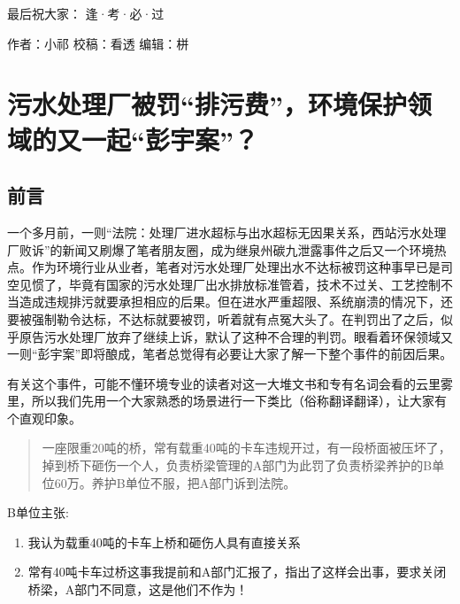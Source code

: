 \documentclass[]{book}
\begin{document}
最后祝大家： 逢·考·必·过

作者：小祁
校稿：看透
编辑：栟

\hypertarget{ux6c61ux6c34ux5904ux7406ux5382ux88abux7f5aux6392ux6c61ux8d39ux73afux5883ux4fddux62a4ux9886ux57dfux7684ux53c8ux4e00ux8d77ux5f6dux5b87ux6848}{%
\section{污水处理厂被罚``排污费''，环境保护领域的又一起``彭宇案''？}\label{ux6c61ux6c34ux5904ux7406ux5382ux88abux7f5aux6392ux6c61ux8d39ux73afux5883ux4fddux62a4ux9886ux57dfux7684ux53c8ux4e00ux8d77ux5f6dux5b87ux6848}}

\hypertarget{ux524dux8a00-1}{%
\subsection{前言}\label{ux524dux8a00-1}}

一个多月前，一则``法院：处理厂进水超标与出水超标无因果关系，西站污水处理厂败诉''的新闻又刷爆了笔者朋友圈，成为继泉州碳九泄露事件之后又一个环境热点。作为环境行业从业者，笔者对污水处理厂处理出水不达标被罚这种事早已是司空见惯了，毕竟有国家的污水处理厂出水排放标准管着，技术不过关、工艺控制不当造成违规排污就要承担相应的后果。但在进水严重超限、系统崩溃的情况下，还要被强制勒令达标，不达标就要被罚，听着就有点冤大头了。在判罚出了之后，似乎原告污水处理厂放弃了继续上诉，默认了这种不合理的判罚。眼看着环保领域又一则``彭宇案''即将酿成，笔者总觉得有必要让大家了解一下整个事件的前因后果。

有关这个事件，可能不懂环境专业的读者对这一大堆文书和专有名词会看的云里雾里，所以我们先用一个大家熟悉的场景进行一下类比（俗称翻译翻译），让大家有个直观印象。

\begin{quote}
一座限重20吨的桥，常有载重40吨的卡车违规开过，有一段桥面被压坏了，掉到桥下砸伤一个人，负责桥梁管理的A部门为此罚了负责桥梁养护的B单位60万。养护B单位不服，把A部门诉到法院。
\end{quote}

B单位主张:

\begin{enumerate}
\def\labelenumi{\arabic{enumi}.}
\item
  我认为载重40吨的卡车上桥和砸伤人具有直接关系
\item
  常有40吨卡车过桥这事我提前和A部门汇报了，指出了这样会出事，要求关闭桥梁，A部门不同意，这是他们不作为！
\end{enumerate}
\end{document}
